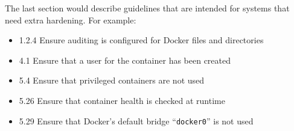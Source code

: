 \medskip

The last section would describe guidelines that are intended for systems that need extra hardening. For example:
\begin{itemize}
    \item 1.2.4 Ensure auditing is configured for Docker files and directories
    \item 4.1 Ensure that a user for the container has been created
    \item 5.4 Ensure that privileged containers are not used
    \item 5.26 Ensure that container health is checked at runtime
    \item 5.29 Ensure that Docker's default bridge ``\lstinline{docker0}'' is not used
\end{itemize}
